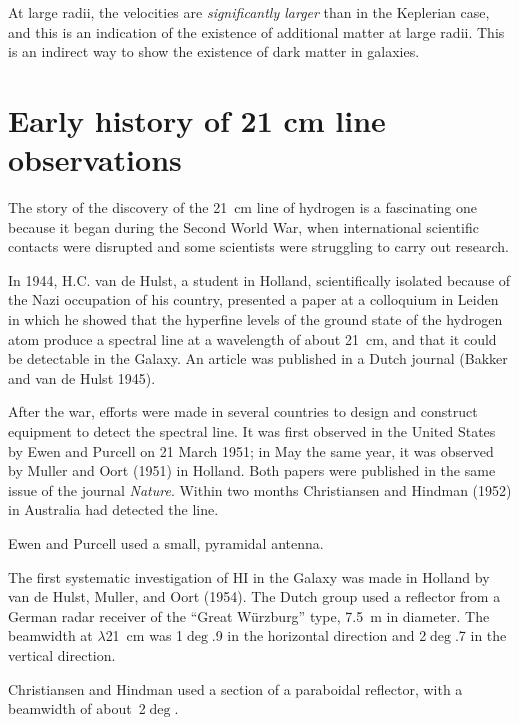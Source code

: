 At large radii, the velocities are {\it significantly larger} than in
the Keplerian case, and this is an indication of the existence of
additional matter at large radii. This is an indirect way to show the
existence of dark matter in galaxies.

\chapter{Early history of 21 cm line observations}\label{app-history}

The story of the discovery of the 21~cm line of hydrogen is a
fascinating one because it began during the Second World War, when
international scientific contacts were disrupted and some scientists
were struggling to carry out research.

In 1944, H.C. van de Hulst, a student in Holland, scientifically
isolated because of the Nazi occupation of his country, presented a
paper at a colloquium in Leiden in which he showed that the hyperfine
levels of the ground state of the hydrogen atom produce a spectral
line at a wavelength of about 21~cm, and that it could be detectable
in the Galaxy.  An article was published in a Dutch journal (Bakker
and van de Hulst 1945).

After the war, efforts were made in several countries to design and
construct equipment to detect the spectral line. It was first observed
in the United States by Ewen and Purcell on 21 March 1951; in May the
same year, it was observed by Muller and Oort (1951) in Holland. Both
papers were published in the same issue of the journal {\it Nature}.
Within two months Christiansen and Hindman (1952) in Australia had
detected the line.

Ewen and Purcell used a small, pyramidal antenna.

The first systematic investigation of HI in the Galaxy was made in
Holland by van de Hulst, Muller, and Oort (1954).  The Dutch group
used a reflector from a German radar receiver of the ``Great
W\"urzburg'' type, 7.5~m in diameter.  The beamwidth at $\lambda$21~cm
was 1$\deg$.9 in the horizontal direction and 2$\deg$.7 in the
vertical direction.

Christiansen and Hindman used a section of a paraboidal reflector,
with a beamwidth of about~2$\deg$.
